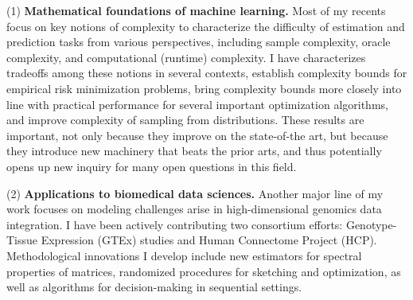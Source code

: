 \documentclass[11pt]{article}
\theoremstyle{exampstyle}
\theoremstyle{definition}
\begin{document}
(1) {\bf Mathematical foundations of machine learning.} %
Most of my recents focus on key notions of complexity to characterize the difficulty of estimation and prediction tasks from various perspectives, including sample complexity, oracle complexity, and computational (runtime) complexity. I have characterizes tradeoffs among these notions in several contexts, establish complexity bounds for empirical risk minimization problems, bring complexity bounds more closely into line with practical performance for several important optimization algorithms, and improve complexity of sampling from distributions. These results are important, not only because they improve on the state-of-the art, but because they introduce new machinery that beats the prior arts, and thus potentially opens up new inquiry for many open questions in this field. 

(2) {\bf Applications to biomedical data sciences. }Another major line of my work focuses on modeling challenges arise in high-dimensional genomics data integration. I have been actively contributing two consortium efforts: Genotype-Tissue Expression (GTEx) studies and Human Connectome Project (HCP). %
Methodological innovations I develop include new estimators for spectral properties of matrices, randomized procedures for sketching and optimization, as well as algorithms for decision-making in sequential settings.  
\end{document}
